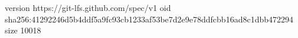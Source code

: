 version https://git-lfs.github.com/spec/v1
oid sha256:41292246d5b4ddf5a9fc93cb1233af53be7d2e9e78ddfcbb16ad8c1dbb472294
size 10018
